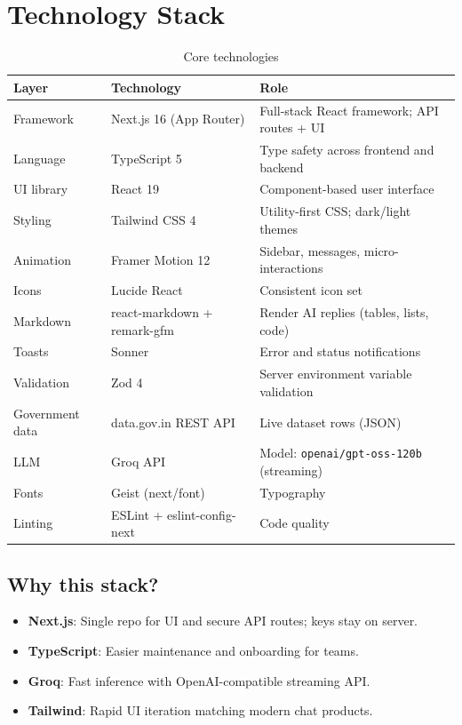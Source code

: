 \documentclass[11pt,a4paper]{article}
\begin{document}
\section{Technology Stack}

\begin{table}[h]
\centering
\caption{Core technologies}
\begin{tabular}{@{}llp{7.5cm}@{}}
\toprule
\textbf{Layer} & \textbf{Technology} & \textbf{Role} \\
\midrule
Framework & Next.js 16 (App Router) & Full-stack React framework; API routes + UI \\
Language & TypeScript 5 & Type safety across frontend and backend \\
UI library & React 19 & Component-based user interface \\
Styling & Tailwind CSS 4 & Utility-first CSS; dark/light themes \\
Animation & Framer Motion 12 & Sidebar, messages, micro-interactions \\
Icons & Lucide React & Consistent icon set \\
Markdown & react-markdown + remark-gfm & Render AI replies (tables, lists, code) \\
Toasts & Sonner & Error and status notifications \\
Validation & Zod 4 & Server environment variable validation \\
Government data & data.gov.in REST API & Live dataset rows (JSON) \\
LLM & Groq API & Model: \texttt{openai/gpt-oss-120b} (streaming) \\
Fonts & Geist (next/font) & Typography \\
Linting & ESLint + eslint-config-next & Code quality \\
\bottomrule
\end{tabular}
\end{table}

\subsection{Why this stack?}
\begin{itemize}[noitemsep]
  \item \textbf{Next.js}: Single repo for UI and secure API routes; keys stay on server.
  \item \textbf{TypeScript}: Easier maintenance and onboarding for teams.
  \item \textbf{Groq}: Fast inference with OpenAI-compatible streaming API.
  \item \textbf{Tailwind}: Rapid UI iteration matching modern chat products.
\end{itemize}
\end{document}
